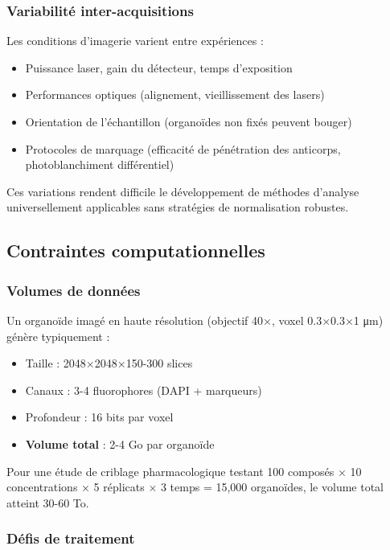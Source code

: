 \subsubsection{Variabilité inter-acquisitions}

Les conditions d'imagerie varient entre expériences :
\begin{itemize}
    \item Puissance laser, gain du détecteur, temps d'exposition
    \item Performances optiques (alignement, vieillissement des lasers)
    \item Orientation de l'échantillon (organoïdes non fixés peuvent bouger)
    \item Protocoles de marquage (efficacité de pénétration des anticorps, photoblanchiment différentiel)
\end{itemize}

Ces variations rendent difficile le développement de méthodes d'analyse universellement applicables sans stratégies de normalisation robustes.

\subsection{Contraintes computationnelles}

\subsubsection{Volumes de données}

Un organoïde imagé en haute résolution (objectif 40×, voxel 0.3×0.3×1 μm) génère typiquement :
\begin{itemize}
    \item Taille : 2048×2048×150-300 slices
    \item Canaux : 3-4 fluorophores (DAPI + marqueurs)
    \item Profondeur : 16 bits par voxel
    \item \textbf{Volume total} : 2-4 Go par organoïde
\end{itemize}

Pour une étude de criblage pharmacologique testant 100 composés × 10 concentrations × 5 réplicats × 3 temps = 15,000 organoïdes, le volume total atteint 30-60 To.

\subsubsection{Défis de traitement}

